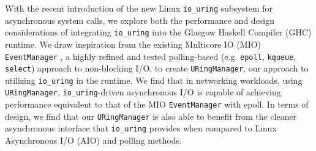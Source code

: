 \begin{abstrct}

With the recent introduction of the new Linux \texttt{io\_uring} subsystem for
asynchronous system calls, we explore both the performance and design
considerations of integrating \texttt{io\_uring} into the Glasgow Haskell Compiler (GHC)
runtime. We draw inspiration from the existing Multicore IO (MIO)
\texttt{EventManager} \cite{mio}, a highly refined and tested polling-based
(e.g. \texttt{epoll}, \texttt{kqueue}, \texttt{select}) approach
to non-blocking I/O,
to create \newline
\texttt{URingManager}, our approach to utilizing \texttt{io\_uring}
in the runtime. We find that in networking workloads, using
\texttt{URingManager},
\texttt{io\_uring}-driven asynchronous I/O is capable of achieving performance
equivalent to that of the MIO \texttt{EventManager} with epoll. In terms of
design, we find that our \texttt{URingManager} is also able to benefit from
the cleaner asynchronous interface that \texttt{io\_uring} provides when
compared to Linux Asynchronous I/O (AIO) and polling methods.

\end{abstrct}
